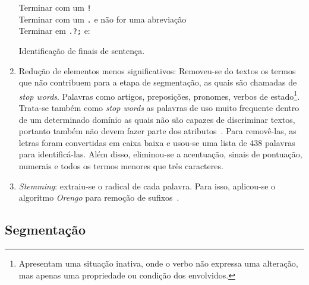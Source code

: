 \begin{enumerate}
\begin{algorithm}
{	Terminar com um \texttt{!}\\
	Terminar com um \texttt{.} e não for uma abreviação\\
	Terminar em \texttt{.?;} e:
	}
	
	\caption{Identificação de finais de sentença.}
	\label{alg:identificacaofinaisdesent}
\end{algorithm}




\item Redução de elementos menos significativos: Removeu-se do textos os termos que não contribuem para a etapa de segmentação, 
	as quais são chamadas de \textit{stop words}. Palavras como artigos, preposições, pronomes, verbos de estado\footnote{Apresentam uma situação inativa, onde o verbo não expressa uma alteração, mas apenas uma propriedade ou condição dos envolvidos.}. Trata-se também como \textit{stop words} as palavras de uso muito frequente dentro de um determinado domínio as quais não são capazes de discriminar textos, portanto também não devem fazer parte dos atributos~\cite{Rezende2003}. Para removê-las, as letras foram convertidas em caixa baixa e usou-se uma lista de 438 palavras para identificá-las. Além disso, eliminou-se a acentuação, sinais de pontuação, numerais e todos os termos menores que três caracteres.

\item \textit{Stemming}: extraiu-se o radical de cada palavra. Para isso, aplicou-se o algoritmo \textit{Orengo} %
	para remoção de sufixos~\cite{Alvares2005}.

\end{enumerate}
	





\subsection{Segmentação}

